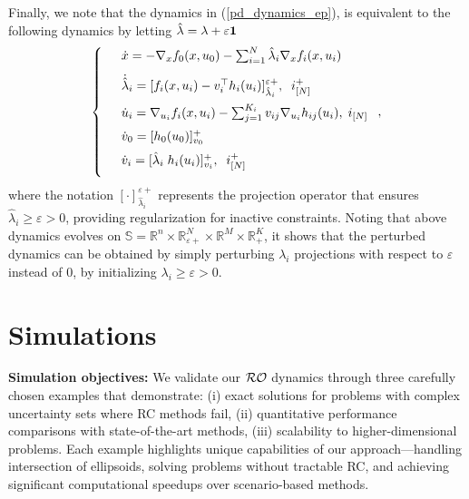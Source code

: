 \documentclass[journal,twoside,web]{ieeecolor}
\newcommand{\rev}[1]{\textcolor{revisionblue}{#1}}
\begin{document}
Finally, we note that the dynamics in (\ref{pd_dynamics_ep}), is equivalent to the following dynamics by letting $\hat{\lambda}=\lambda+\varepsilon {\bf 1}$
\begin{align} \label{pd_dynamics_0}
\left\{
\begin{array}{cl}
\vspace{3mm}
&\dot x=-\nabla_x f_0(x,u_0)-\sum_{i=1}^N\hat{\lambda}_i \nabla_x f_i(x,u_i)\\
\vspace{2mm}
&\dot{\hat{\lambda}}_i=[f_i(x,u_i)-v_i^\top h_i(u_i)]_{\hat{\lambda}_i}^{\varepsilon +},\;\; i^+_{[N]}\\
\vspace{2mm}
&\dot u_i=\nabla_{u_i}f_i(x,u_i)-\sum_{j=1}^{K_i} v_{ij} \nabla_{u_i} h_{ij}(u_i),\; i_{[N]}\\
\vspace{2mm}
&\dot{v}_0=[h_0(u_0)]_{v_0}^+\\
\vspace{2mm}
&\dot v_i=[\hat{\lambda}_i \; h_i(u_i)]_{v_i}^+,\;\;i^+_{[N]}
\end{array}\right.,
\end{align}
\rev{where the notation $[\cdot]_{\hat{\lambda}_i}^{\varepsilon+}$ represents the projection operator that ensures $\hat{\lambda}_i \geq \varepsilon > 0$, providing regularization for inactive constraints.}
Noting that above dynamics evolves on $\mathbb{S}= \mathbb{R}^n \times \mathbb{R}^N_{\varepsilon +} \times \mathbb{R}^M \times \mathbb{R}^K_+$, it shows that the perturbed dynamics can be obtained by simply perturbing $\lambda_i$ projections with respect to $\varepsilon$ instead of $0$, by initializing $\lambda_i \geq \varepsilon > 0$.


\section{Simulations}\label{section_simulations}



\rev{\textbf{Simulation objectives:} We validate our ${\cal RO}$ dynamics through three carefully chosen examples that demonstrate: (i) exact solutions for problems with complex uncertainty sets where RC methods fail, (ii) quantitative performance comparisons with state-of-the-art methods, (iii) scalability to higher-dimensional problems. Each example highlights unique capabilities of our approach—handling intersection of ellipsoids, solving problems without tractable RC, and achieving significant computational speedups over scenario-based methods.}
\end{document}
